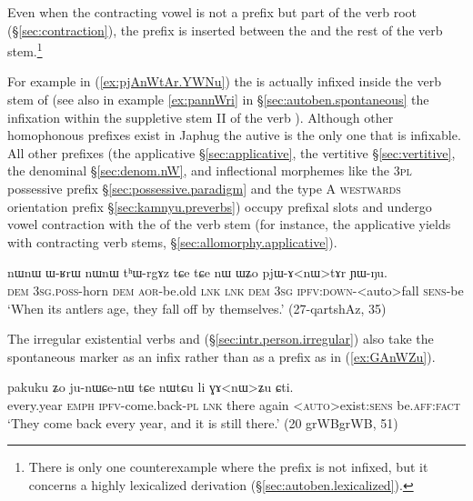 Even when the contracting vowel  is not a prefix but part of the verb root (§\ref{sec:contraction}), the  prefix is inserted between the  and the rest of the verb stem.\footnote{There is only one counterexample where the  prefix is not infixed, but it concerns a highly lexicalized derivation (§\ref{sec:autoben.lexicalized}). }

For example in (\ref{ex:pjAnWtAr.YWNu}) the  is actually infixed inside the verb stem of  (see also in example \ref{ex:pannWri} in §\ref{sec:autoben.spontaneous} the infixation within the suppletive stem II  of the verb ).  Although other homophonous prefixes exist in Japhug the autive is the only one that is infixable. All other  prefixes (the applicative §\ref{sec:applicative}, the vertitive §\ref{sec:vertitive}, the denominal  §\ref{sec:denom.nW}, and inflectional morphemes like the \textsc{3pl} possessive prefix §\ref{sec:possessive.paradigm} and the type A \textsc{westwards} orientation prefix §\ref{sec:kamnyu.preverbs}) occupy prefixal slots and undergo vowel contraction with the  of the verb stem (for instance, the applicative yields  with contracting verb stems, §\ref{sec:allomorphy.applicative}).
 
 \begin{exe}
\ex \label{ex:pjAnWtAr.YWNu}
\gll nɯnɯ ɯ-ʁrɯ nɯnɯ tʰɯ-rgɤz tɕe tɕe nɯ ɯʑo pjɯ-ɤ<nɯ>tɤr ɲɯ-ŋu.  \\
\textsc{dem} \textsc{3sg}.\textsc{poss}-horn \textsc{dem} \textsc{aor}-be.old \textsc{lnk}   \textsc{lnk} \textsc{dem} \textsc{3sg} \textsc{ipfv}:\textsc{down}-<auto>fall \textsc{sens}-be \\
\glt `When its antlers age, they fall off by themselves.' (27-qartshAz, 35)
\end{exe}


The irregular existential verbs  and  (§\ref{sec:intr.person.irregular}) also take  the spontaneous marker as an infix rather than as a prefix as in (\ref{ex:GAnWZu}). 

\begin{exe}
\ex \label{ex:GAnWZu}
\gll pakuku ʑo ju-nɯɕe-nɯ tɕe nɯtɕu li ɣɤ<nɯ>ʑu ɕti. 	\\
 every.year \textsc{emph} \textsc{ipfv}-come.back-\textsc{pl} \textsc{lnk} there again <\textsc{auto}>exist:\textsc{sens} be.\textsc{aff}:\textsc{fact} \\
 \glt `They come back every year, and it is still there.' (20 grWBgrWB, 51)
\end{exe}

